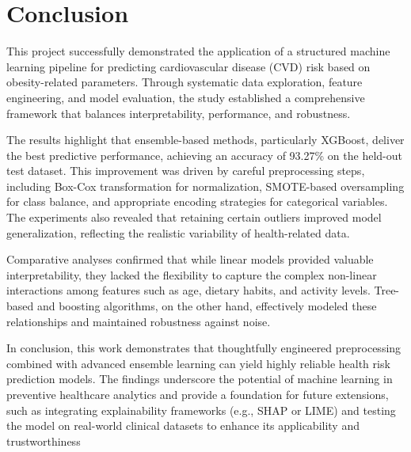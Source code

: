 \documentclass[12pt,a4paper]{report}
\begin{document}
    \tableofcontents
    \newpage

    
    
    
    
    
    
    

    {
        \chapter*{Conclusion}
        This project successfully demonstrated the application of a structured machine learning pipeline for predicting cardiovascular disease (CVD) risk based on obesity-related parameters.
        Through systematic data exploration, feature engineering, and model evaluation, the study established a comprehensive framework that balances interpretability, performance, and robustness.

        The results highlight that ensemble-based methods, particularly XGBoost, deliver the best predictive performance, achieving an accuracy of 93.27\% on the held-out test dataset.
        This improvement was driven by careful preprocessing steps, including Box-Cox transformation for normalization, SMOTE-based oversampling for class balance, and appropriate encoding strategies for categorical variables.
        The experiments also revealed that retaining certain outliers improved model generalization, reflecting the realistic variability of health-related data.

        Comparative analyses confirmed that while linear models provided valuable interpretability, they lacked the flexibility to capture the complex non-linear interactions among features such as age, dietary habits, and activity levels.
        Tree-based and boosting algorithms, on the other hand, effectively modeled these relationships and maintained robustness against noise.

        In conclusion, this work demonstrates that thoughtfully engineered preprocessing combined with advanced ensemble learning can yield highly reliable health risk prediction models.
        The findings underscore the potential of machine learning in preventive healthcare analytics and provide a foundation for future extensions, such as integrating explainability frameworks (e.g., SHAP or LIME) and testing the model on real-world clinical datasets to enhance its applicability and trustworthiness
    }
\end{document}
